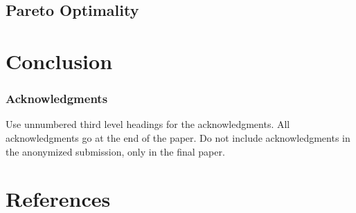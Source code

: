 \documentclass{article}
\begin{document}
\subsection{Pareto Optimality}%
\label{sub:pareto_optimality}

\section{Conclusion}%
\label{sec:conclusion}

\subsubsection*{Acknowledgments}

Use unnumbered third level headings for the acknowledgments. All
acknowledgments go at the end of the paper. Do not include
acknowledgments in the anonymized submission, only in the final paper.

\section*{References}



\end{document}
